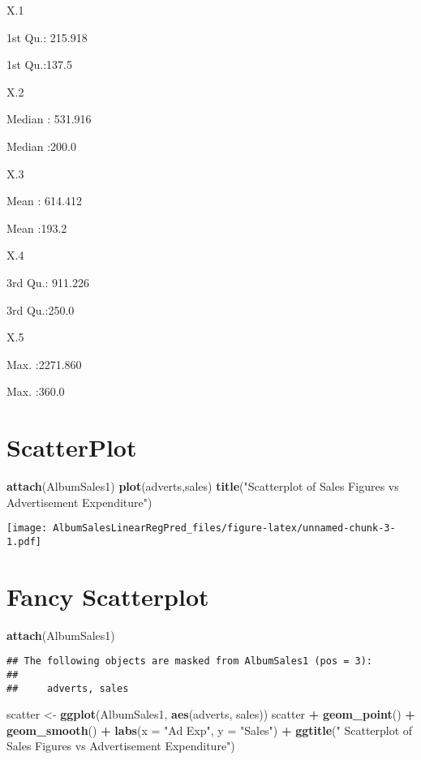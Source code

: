 \documentclass[]{article}
\newenvironment{Shaded}{\begin{snugshade}}{\end{snugshade}}
\newcommand{\KeywordTok}[1]{\textcolor[rgb]{0.13,0.29,0.53}{\textbf{#1}}}
\newcommand{\DataTypeTok}[1]{\textcolor[rgb]{0.13,0.29,0.53}{#1}}
\newcommand{\StringTok}[1]{\textcolor[rgb]{0.31,0.60,0.02}{#1}}
\newcommand{\OperatorTok}[1]{\textcolor[rgb]{0.81,0.36,0.00}{\textbf{#1}}}
\newcommand{\NormalTok}[1]{#1}
\begin{document}
X.1

1st Qu.: 215.918

1st Qu.:137.5

X.2

Median : 531.916

Median :200.0

X.3

Mean : 614.412

Mean :193.2

X.4

3rd Qu.: 911.226

3rd Qu.:250.0

X.5

Max. :2271.860

Max. :360.0

\section{ScatterPlot}\label{scatterplot}

\begin{Shaded}
\begin{Highlighting}[]
\KeywordTok{attach}\NormalTok{(AlbumSales1)}
\KeywordTok{plot}\NormalTok{(adverts,sales)}
\KeywordTok{title}\NormalTok{(}\StringTok{"Scatterplot of Sales Figures vs Advertisement Expenditure"}\NormalTok{)}
\end{Highlighting}
\end{Shaded}

\texttt{[image: AlbumSalesLinearRegPred\_files/figure-latex/unnamed-chunk-3-1.pdf]}

\section{Fancy Scatterplot}\label{fancy-scatterplot}

\begin{Shaded}
\begin{Highlighting}[]
\KeywordTok{attach}\NormalTok{(AlbumSales1)}
\end{Highlighting}
\end{Shaded}

\begin{verbatim}
## The following objects are masked from AlbumSales1 (pos = 3):
## 
##     adverts, sales
\end{verbatim}

\begin{Shaded}
\begin{Highlighting}[]
\NormalTok{scatter <-}\StringTok{ }\KeywordTok{ggplot}\NormalTok{(AlbumSales1, }\KeywordTok{aes}\NormalTok{(adverts, sales))}
\NormalTok{scatter }\OperatorTok{+}\StringTok{ }\KeywordTok{geom_point}\NormalTok{() }\OperatorTok{+}\StringTok{ }\KeywordTok{geom_smooth}\NormalTok{() }\OperatorTok{+}\StringTok{ }\KeywordTok{labs}\NormalTok{(}\DataTypeTok{x =} \StringTok{"Ad Exp"}\NormalTok{, }\DataTypeTok{y =} \StringTok{"Sales"}\NormalTok{) }\OperatorTok{+}\StringTok{ }\KeywordTok{ggtitle}\NormalTok{(}\StringTok{"      Scatterplot of Sales Figures vs Advertisement Expenditure"}\NormalTok{)}
\end{Highlighting}
\end{Shaded}
\end{document}
